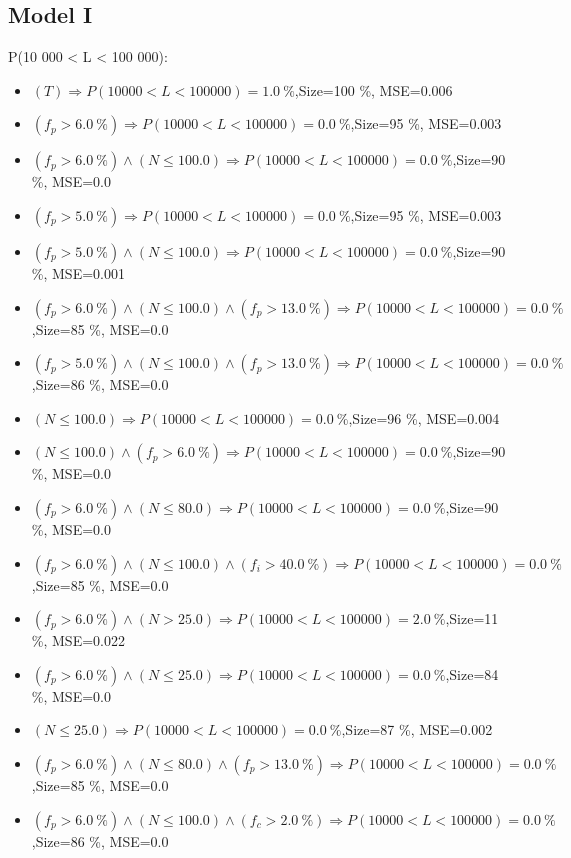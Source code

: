 \documentclass[numbered]{CSL}
\begin{document}
\subsection{Model I}
P(10 000 < L < 100 000):
\begin{itemize}
\item $(T) \Rightarrow P(10 000 < L < 100 000) = 1.0~\%$,\hfill Size=100 \%, MSE=0.006
\item $(f_p > 6.0~\%) \Rightarrow P(10 000 < L < 100 000) = 0.0~\%$,\hfill Size=95 \%, MSE=0.003
\item $(f_p > 6.0~\%) \land (N \leq 100.0) \Rightarrow P(10 000 < L < 100 000) = 0.0~\%$,\hfill Size=90 \%, MSE=0.0
\item $(f_p > 5.0~\%) \Rightarrow P(10 000 < L < 100 000) = 0.0~\%$,\hfill Size=95 \%, MSE=0.003
\item $(f_p > 5.0~\%) \land (N \leq 100.0) \Rightarrow P(10 000 < L < 100 000) = 0.0~\%$,\hfill Size=90 \%, MSE=0.001
\item $(f_p > 6.0~\%) \land (N \leq 100.0) \land (f_p > 13.0~\%) \Rightarrow P(10 000 < L < 100 000) = 0.0~\%$,\hfill Size=85 \%, MSE=0.0
\item $(f_p > 5.0~\%) \land (N \leq 100.0) \land (f_p > 13.0~\%) \Rightarrow P(10 000 < L < 100 000) = 0.0~\%$,\hfill Size=86 \%, MSE=0.0
\item $(N \leq 100.0) \Rightarrow P(10 000 < L < 100 000) = 0.0~\%$,\hfill Size=96 \%, MSE=0.004
\item $(N \leq 100.0) \land (f_p > 6.0~\%) \Rightarrow P(10 000 < L < 100 000) = 0.0~\%$,\hfill Size=90 \%, MSE=0.0
\item $(f_p > 6.0~\%) \land (N \leq 80.0) \Rightarrow P(10 000 < L < 100 000) = 0.0~\%$,\hfill Size=90 \%, MSE=0.0
\item $(f_p > 6.0~\%) \land (N \leq 100.0) \land (f_i > 40.0~\%) \Rightarrow P(10 000 < L < 100 000) = 0.0~\%$,\hfill Size=85 \%, MSE=0.0
\item $(f_p > 6.0~\%) \land (N > 25.0) \Rightarrow P(10 000 < L < 100 000) = 2.0~\%$,\hfill Size=11 \%, MSE=0.022
\item $(f_p > 6.0~\%) \land (N \leq 25.0) \Rightarrow P(10 000 < L < 100 000) = 0.0~\%$,\hfill Size=84 \%, MSE=0.0
\item $(N \leq 25.0) \Rightarrow P(10 000 < L < 100 000) = 0.0~\%$,\hfill Size=87 \%, MSE=0.002
\item $(f_p > 6.0~\%) \land (N \leq 80.0) \land (f_p > 13.0~\%) \Rightarrow P(10 000 < L < 100 000) = 0.0~\%$,\hfill Size=85 \%, MSE=0.0
\item $(f_p > 6.0~\%) \land (N \leq 100.0) \land (f_c > 2.0~\%) \Rightarrow P(10 000 < L < 100 000) = 0.0~\%$,\hfill Size=86 \%, MSE=0.0

\end{itemize}
\end{document}
